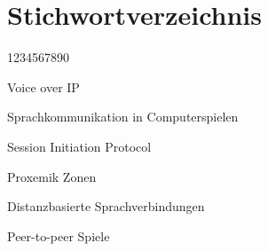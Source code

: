 %
%

\chapter{Stichwortverzeichnis} %
\begin{labeling}{1234567890}
        \item Voice over IP
        \item Sprachkommunikation in Computerspielen
        \item Session Initiation Protocol
        \item Proxemik Zonen
        \item Distanzbasierte Sprachverbindungen
        \item Peer-to-peer Spiele
\end{labeling} 


